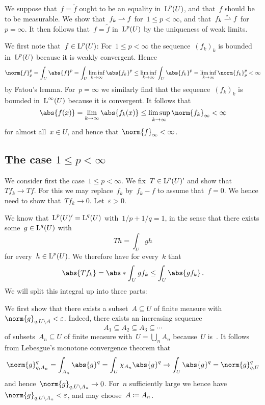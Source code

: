 \section{}

We suppose that~$f = \tilde{f}$ ought to be an equality in~$\operatorname{L}^p(U)$, and that~$f$ should be to be measurable.
We show that~$f_k \rightharpoonup f$ for~$1 \leq p < \infty$, and that~$f_k \wtostar f$ for~$p = \infty$.
It then follows that~$f = \tilde{f}$ in~$\operatorname{L}^p(U)$ by the uniqueness of weak limits.

We first note that~$f \in \operatorname{L}^p(U)$:
For~$1 \leq p < \infty$ the sequence~$(f_k)_k$ is bounded in~$\operatorname{L}^p(U)$ because it is weakly convergent.
Hence
\[
  \norm{f}_p^p
  =
  \int_U \abs{f}^p
  =
  \int_U \liminf_{k \to \infty} \abs{f_k}^p
  \leq
  \liminf_{k \to \infty} \int_U \abs{f_k}^p
  =
  \liminf_{k \to \infty} \norm{f_k}_p^p
  <
  \infty
\]
by Fatou’s lemma.
For~$p = \infty$ we similarly find that the sequence~$(f_k)_k$ is bounded in~$\operatorname{L}^\infty(U)$ because it is {\weaklystar} convergent.
It follows that
\[
  \abs{f(x)}
  =
  \lim_{k \to \infty} \abs{f_k(x)}
  \leq
  \limsup_{k \to \infty} \norm{f_k}_\infty
  <
  \infty
\]
for almost all~$x \in U$, and hence that~$\norm{f}_\infty < \infty$.





\subsection*{The case $1 \leq p < \infty$}

We consider first the case~$1 \leq p < \infty$.
We fix~$T \in \operatorname{L}^p(U)'$ and show that~$T f_k \to T f$.
For this we may replace~$f_k$ by~$f_k - f$ to assume that~$f = 0$.
We hence need to show that~$T f_k \to 0$.
Let~$\varepsilon > 0$.

We know that~$\operatorname{L}^p(U)' = \operatorname{L}^q(U)$ with~$1/p + 1/q = 1$, in the sense that there exists some~$g \in \operatorname{L}^q(U)$ with
\[
    T h
  = \int_U g h
\]
for every~$h \in \operatorname{L}^p(U)$.
We therefore have for every~$k$ that
\[
  \abs{ T f_k }
  =
  \abs*{ \int_U g f_k }
  \leq
  \int_U \abs{g f_k} \,.
\]
We will split this integral up into three parts:

We first show that there exists a subset~$A \subseteq U$ of finite measure with~$\norm{g}_{q,U \setminus A} < \varepsilon$.
Indeed, there exists an increasing sequence
\[
  A_1
  \subseteq
  A_2
  \subseteq
  A_3
  \subseteq
  \dotsb
\]
of subsets~$A_n \subseteq U$ of finite measure with~$U = \bigcup_n A_n$ because~$U$ is~.
It follows from Lebesgue’s monotone convergence theorem that
\[
  \norm{g}_{q,A_n}^q
  =
  \int_{A_n} \abs{g}^q
  =
  \int_U \chi_{A_n} \abs{g}^q
  \to
  \int_U \abs{g}^q
  =
  \norm{g}_{q,U}^q
\]
and hence~$\norm{g}_{q, U \setminus A_n} \to 0$.
For~$n$ sufficiently large we hence have~$\norm{g}_{q, U \setminus A_n} < \varepsilon$, and may choose~$A \coloneqq A_n$.

